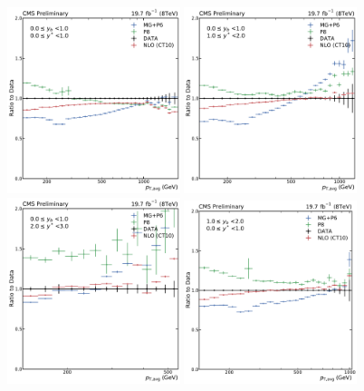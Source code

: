 \begin{figure}[htbp]
    \centering
    \includegraphics[width=0.45\textwidth]{figures/measurement/ratio_reco_to_data_yb0ys0.pdf}\hfill
    \includegraphics[width=0.45\textwidth]{figures/measurement/ratio_reco_to_data_yb0ys1.pdf}
    \includegraphics[width=0.45\textwidth]{figures/measurement/ratio_reco_to_data_yb0ys2.pdf}\hfill
    \includegraphics[width=0.45\textwidth]{figures/measurement/ratio_reco_to_data_yb1ys0.pdf}

\end{figure}
